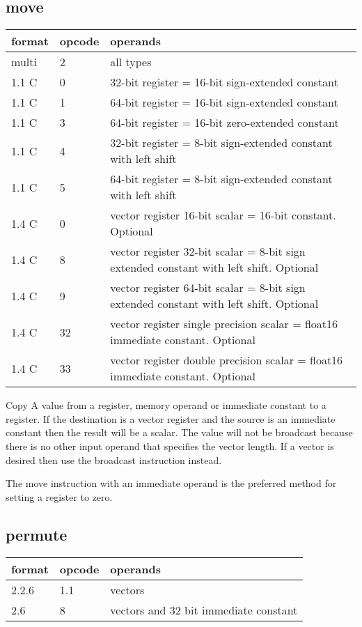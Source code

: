 \documentclass[forwardcom.tex]{subfiles}
\begin{document}
\subsection{move}
\label{table:moveInstruction}
\begin{tabular}{|p{12mm}|p{15mm}|p{100mm}|}
\hline
\bfseries format & \bfseries opcode & \bfseries operands \\ \hline
multi &  2 & all types \\ \hline
1.1 C &  0 & 32-bit register = 16-bit sign-extended constant \\ \hline
1.1 C &  1 & 64-bit register = 16-bit sign-extended constant \\ \hline
1.1 C &  3 & 64-bit register = 16-bit zero-extended constant \\ \hline
1.1 C &  4 & 32-bit register = 8-bit sign-extended constant with left shift \\ \hline
1.1 C &  5 & 64-bit register = 8-bit sign-extended constant with left shift \\ \hline
1.4 C &  0 & vector register 16-bit scalar = 16-bit constant. Optional  \\ \hline
1.4 C &  8 & vector register 32-bit scalar = 8-bit sign extended constant with left shift. Optional \\ \hline
1.4 C &  9 & vector register 64-bit scalar = 8-bit sign extended constant with left shift. Optional \\ \hline
1.4 C & 32 & vector register single precision scalar = float16 immediate constant. Optional \\ \hline
1.4 C & 33 & vector register double precision scalar = float16 immediate constant. Optional \\ \hline
\end{tabular}
\vv

Copy A value from a register, memory operand or immediate constant to a register. If the destination is a vector register and the source is an immediate constant then the result will be a scalar. The value will not be broadcast because there is no other input operand that specifies the vector length. If a vector is desired then use the broadcast instruction instead.
\vv

The move instruction with an immediate operand is the preferred method for setting a register to zero.
\vv


\subsection{permute}
\label{table:permuteInstruction}
\begin{tabular}{|p{12mm}|p{15mm}|p{100mm}|}
\hline
\bfseries format & \bfseries opcode & \bfseries operands \\ \hline
2.2.6 & 1.1 & vectors \\ \hline
2.6   & 8   & vectors and 32 bit immediate constant \\ \hline
\end{tabular}
\vv
\end{document}
